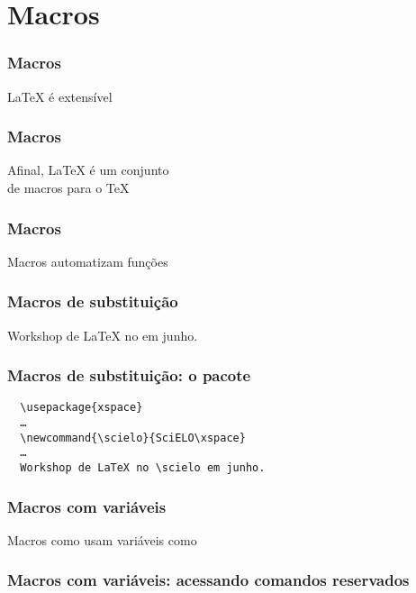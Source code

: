 \section{Macros}

\begin{frame}
  \frametitle{Macros}
  \LARGE
  \LaTeX{} é extensível
\end{frame}

\begin{frame}
  \frametitle{Macros}
  \LARGE
  Afinal, \LaTeX{} é um conjunto\\ de macros para o \TeX
\end{frame}

\begin{frame}
  \frametitle{Macros}
  \LARGE
  Macros automatizam funções
\end{frame}

\begin{frame}[fragile]
  \frametitle{Macros de substituição}
  \LARGE
  \latexcode{\newcommand{\scielo}{SciELO}}
  \vspace{1em}

  Workshop de LaTeX no \latexcode{\scielo{}} em junho.
\end{frame}

\begin{frame}[fragile]
  \frametitle{Macros de substituição: o pacote }
  \begin{verbatim}
  \usepackage{xspace}
  …
  \newcommand{\scielo}{SciELO\xspace}
  …
  Workshop de LaTeX no \scielo em junho.
  \end{verbatim}
\end{frame}

\begin{frame}
  \frametitle{Macros com variáveis}
  \LARGE
  Macros como \latexcode{\maketitle} usam variáveis como
  \latexcode{\@author}
\end{frame}

\begin{frame}
  \frametitle{Macros com variáveis: acessando comandos reservados}
  \LARGE
\end{frame}

